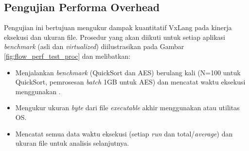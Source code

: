\subsection{Pengujian Performa Overhead}
Pengujian ini bertujuan mengukur dampak kuantitatif VxLang pada kinerja eksekusi dan ukuran file. Prosedur yang akan diikuti untuk setiap aplikasi \textit{benchmark} (asli dan \textit{virtualized}) diilustrasikan pada Gambar \ref{fig:flow_perf_test_proc} dan melibatkan:
\begin{itemize}
    \item {} Menjalankan \textit{benchmark} (QuickSort dan AES) berulang kali (N=100 untuk QuickSort, pemrosesan \textit{batch} 1GB untuk AES) dan mencatat waktu eksekusi menggunakan .
    \item {} Mengukur ukuran \textit{byte} dari file \textit{executable} akhir menggunakan  atau utilitas OS.
    \item {} Mencatat semua data waktu eksekusi (setiap \textit{run} dan total/\textit{average}) dan ukuran file untuk analisis selanjutnya.
\end{itemize}

